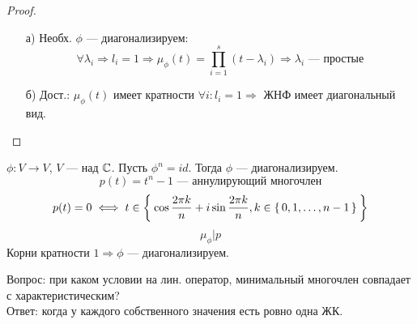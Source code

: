\begin{proof}
    \begin{itemize}
        \item [а) ] Необх. $\phi$ --- диагонализируем:
            \[
            \forall \lambda_i \Rightarrow l_i = 1 \Rightarrow \mu_\phi(t) = \prod_{i = 1}^{s} (t - \lambda_i) \Rightarrow \lambda_i \text{ --- простые}
            \]
        \item [б) ] Дост.: $\mu_\phi(t)$ имеет кратности $\forall i \colon l_i = 1 \Rightarrow $ ЖНФ имеет диагональный вид.
    \end{itemize}
\end{proof}
\begin{example}
    $\phi \colon V \rightarrow V$, $V$ --- над $\mathbb{C}$. Пусть $\phi^{n} = id$. Тогда $\phi$ --- диагонализируем.
    \[
    p(t) = t^{n} - 1 \text{ --- аннулирующий многочлен}
    \]
    \[
    p(t) = 0 \iff t \in \Set{\cos \frac{2\pi k}{n} + i \sin \frac{2 \pi k}{n}, k \in \set{0, 1, \ldots, n - 1}}
    \]
    \[
    \mu_\phi | p
    \]
    Корни кратности $1 \Rightarrow \phi$ --- диагонализируем.
\end{example} 
Вопрос: при каком условии на лин. оператор, минимальный многочлен совпадает с характеристическим? \\
Ответ: когда у каждого собственного значения есть ровно одна ЖК.
